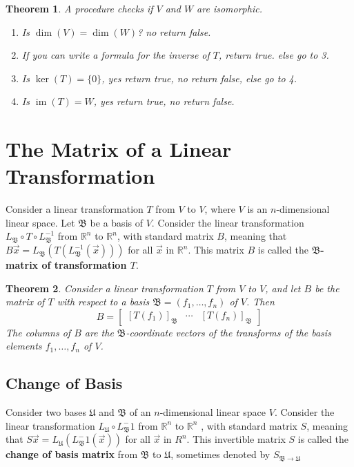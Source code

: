 \documentclass[letter]{article}
\newcommand{\R}{\mathbb{R}}
\newcommand{\B}{\mathfrak{B}}
\newcommand{\U}{\mathfrak{U}}
\newcommand{\im}{\operatorname{im}}
\newtheorem{theorem}{Theorem}[section]
\newenvironment{definition}[1][Definition]{\begin{trivlist}
\item[\hskip \labelsep {\bfseries #1}]}{\end{trivlist}}
\begin{document}
\begin{theorem}
A procedure checks if $V$ and $W$ are isomorphic.
\begin{enumerate}
\item Is $\dim(V) = \dim(W)$? no return false.
\item If you can write a formula for the inverse of $T$, return true. else go to 3.
\item Is $\ker(T) = \{0\}$, yes return true, no return false, else go to 4.
\item Is $\im(T) = W$, yes return true, no return false.
\end{enumerate}
\end{theorem}


\section{The Matrix of a Linear Transformation}
\begin{definition}
Consider a linear transformation $T$ from $V$ to $V$, where $V$ is an $n$-dimensional linear space. Let $\B$ be a basis of $V$. Consider the linear transformation $L_\B \circ T \circ L_\B^{-1}$ from $\R^n$ to $\R^n$, with standard matrix $B$, meaning that $B\vec x = L_\B(T(L_\B^{-1}(\vec x)))$ for all $\vec x$ in $\R^n$. This matrix $B$ is called the \textbf{$\B$-matrix of transformation $T$}.
\end{definition}

\begin{theorem}
Consider a linear transformation $T$ from $V$ to $V$, and let $B$ be the matrix of $T$ with respect to a basis $\B = (f_1,\ldots,f_n)$ of $V$. Then
\[
B = \begin{bmatrix}
[T(f_1)]_\B & \cdots & [T(f_n)]_\B
\end{bmatrix}
\]
The columns of $B$ are the $\B$-coordinate vectors of the transforms of the basis elements $f_1,\ldots,f_n$ of $V$.
\end{theorem}

\subsection{Change of Basis}
\begin{definition}
Consider two bases $\U$ and $\B$ of an $n$-dimensional linear space $V$. Consider the linear transformation $L_\U \circ L_\B^-1$ from $\R^n$ to $\R^n$ , with standard matrix $S$, meaning that $S\vec x = L_\U(L_\B^-1(\vec x))$ for all $\vec x$ in $R^n$. This invertible matrix $S$ is called the \textbf{change of basis matrix} from $\B$ to $\U$, sometimes denoted by $S_{\B\to \U}$
\end{definition}
\end{document}

